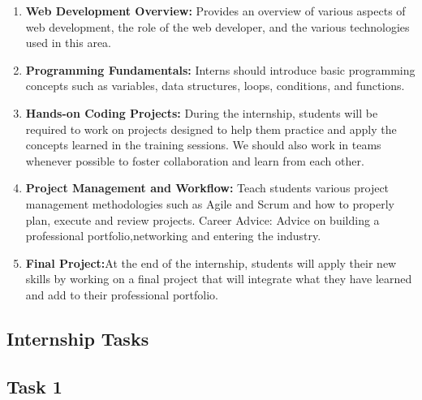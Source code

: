 \begin{enumerate}
\item \textbf{Web Development Overview:} Provides an overview of various aspects of web development, the role of the web developer, and the various technologies used in this area.
\item \textbf{Programming Fundamentals:}  Interns should introduce basic programming concepts such as variables, data structures, loops, conditions, and functions.
\item \textbf{Hands-on Coding Projects:} During the internship, students will be required
to work on projects designed to help them practice and apply the concepts learned in the training sessions. We should also work in teams whenever possible to foster collaboration and learn from each other.
\item  \textbf{Project Management and Workflow:} Teach students various project management methodologies such as Agile and Scrum and how to properly plan, execute and review projects. Career Advice: Advice on building a professional portfolio,networking and entering the industry.
\item \textbf{Final Project:}At the end of the internship, students will apply their new skills by working on a final project that will integrate what they have learned and add to their professional portfolio.
\end{enumerate}
\subsection{Internship Tasks}
\subsection*{Task 1}
